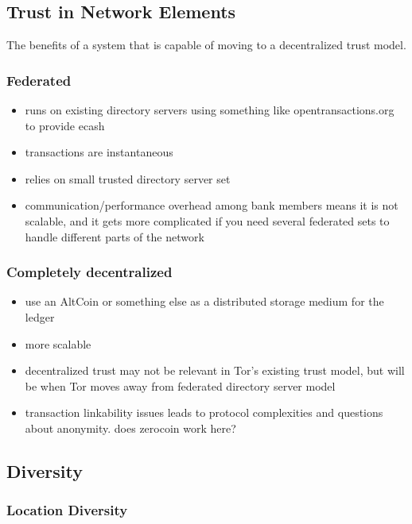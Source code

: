 \subsection{Trust in Network Elements}

The benefits of a system that is capable of moving to a decentralized trust model.

\subsubsection{Federated}

\begin{itemize}
\item runs on existing directory servers using something like opentransactions.org to provide ecash
\item transactions are instantaneous
\item relies on small trusted directory server set
\item communication/performance overhead among bank members means it is not scalable, and it gets more complicated if you need several federated sets to handle different parts of the network
\end{itemize}

\subsubsection{Completely decentralized}

\begin{itemize}
\item use an AltCoin or something else as a distributed storage medium for the ledger
\item more scalable
\item decentralized trust may not be relevant in Tor's existing trust model, but will be when Tor moves away from federated directory server model
\item transaction linkability issues leads to protocol complexities and questions about anonymity. does zerocoin work here?
\end{itemize}

\subsection{Diversity}

\subsubsection{Location Diversity}

